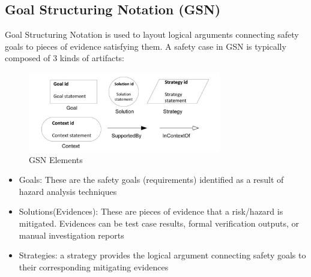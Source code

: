 \documentclass[11pt]{article}
\begin{document}
\subsection{Goal Structuring Notation (GSN)}

Goal Structuring Notation is used to layout logical arguments connecting safety goals to pieces of evidence satisfying them. A safety case in GSN is typically composed of 3 kinds of artifacts:

\begin{figure}
  \centering
  \includegraphics[width=0.75\textwidth]{gsn}
  \caption{GSN Elements}
\end{figure}

\begin{itemize}
\item Goals: These are the safety goals (requirements) identified as a result of hazard analysis techniques
\item Solutions(Evidences): These are pieces of evidence that a risk/hazard is mitigated. Evidences can be test case results, formal verification outputs, or manual investigation reports
\item Strategies: a strategy provides the logical argument connecting safety goals to their corresponding mitigating evidences
\end{itemize}
\end{document}
